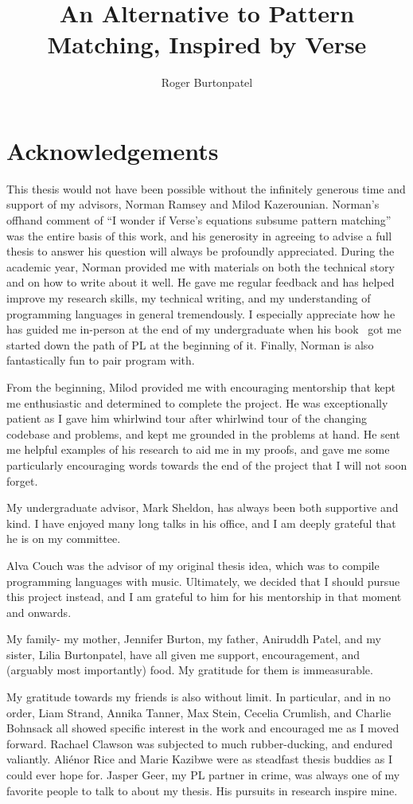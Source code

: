 \documentclass[manuscript,screen,review, 12pt, nonacm]{acmart}
\title{An Alternative to Pattern Matching, Inspired by Verse}
\author{Roger Burtonpatel}
\affiliation{%
\institution{Tufts University}
\streetaddress{419 Boston Ave}
  \city{Medford}
  \state{Massachusetts}
  \country{USA}
  \postcode{02155}
  }
\begin{document}
\section{Acknowledgements}

This thesis would not have been possible without the infinitely generous time
and support of my advisors, Norman Ramsey and Milod Kazerounian. Norman's
offhand comment of “I wonder if Verse's equations subsume pattern matching” was
the entire basis of this work, and his generosity in agreeing to advise a full
thesis to answer his question will always be profoundly appreciated. During the
academic year, Norman provided me with materials on both the technical story and
on how to write about it well. He gave me regular feedback and has helped
improve my research skills, my technical writing, and my understanding of
programming languages in general tremendously. I especially appreciate how he
has guided me in-person at the end of my undergraduate when his book~\citep{bpc}
got me started down the path of PL at the beginning of it. Finally, Norman is
also fantastically fun to pair program with. 

From the beginning, Milod provided me with encouraging mentorship that kept
me enthusiastic and determined to complete the project. He was exceptionally
patient as I gave him whirlwind tour after whirlwind tour of the changing
codebase and problems, and kept me grounded in the problems at hand. He 
sent me helpful examples of his research to aid me in my proofs, and gave me
some particularly encouraging words towards the end of the project that I 
will not soon forget. 

My undergraduate advisor, Mark Sheldon, has always been both supportive and
kind. I have enjoyed many long talks in his office, and I am deeply grateful
that he is on my committee. 

Alva Couch was the advisor of my original thesis idea, which was to compile
programming languages with music. Ultimately, we decided that I should pursue
this project instead, and I am grateful to him for his mentorship in that moment
and onwards. 

My family- my mother, Jennifer Burton, my father, Aniruddh Patel, and my
sister, Lilia Burtonpatel, have all given me support, encouragement, and
(arguably most importantly) food. My gratitude for them is immeasurable. 

My gratitude towards my friends is also without limit. In particular, and in
no order, Liam Strand, Annika Tanner, Max Stein, Cecelia Crumlish, and
Charlie Bohnsack all showed specific interest in the work and encouraged me
as I moved forward. Rachael Clawson was subjected to much rubber-ducking,
and endured valiantly. Aliénor Rice and Marie Kazibwe were as steadfast
thesis buddies as I could ever hope for. Jasper Geer, my PL partner in
crime, was always one of my favorite people to talk to about my thesis. His
pursuits in research inspire mine. 
\end{document}
